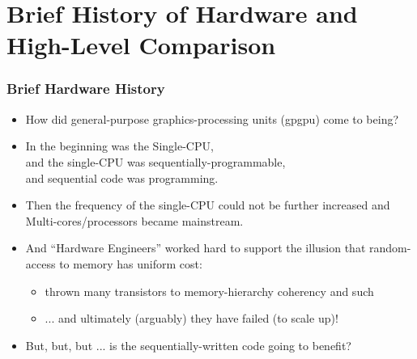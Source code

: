 \documentclass{beamer}
\renewcommand{\emph}[1]{\textcolor{structure}{#1}}
\begin{document}
\begin{frame}[fragile]
	\tableofcontents
\end{frame}

\section{Brief History of Hardware and High-Level Comparison}


\begin{frame}
  \frametitle{Brief Hardware History} 
  \centering
\begin{itemize}
    \item How did general-purpose graphics-processing units (\emph{{\sc gpgpu}}) come to being?\bigskip 
    
    \item In the beginning was the \emph{Single-CPU},\smallskip \\ 
            and the \emph{single-CPU} was sequentially-programmable,\smallskip \\ 
            and sequential code was programming.\bigskip

    \item Then the frequency of the single-CPU could not be further increased 
            and \emph{Multi-cores/processors} became mainstream. \bigskip

    \item And ``Hardware Engineers'' worked hard to support the illusion that 
            random-access to memory has uniform cost: \\ \smallskip
        \begin{itemize}
            \item   thrown many transistors to memory-hierarchy coherency and such\\ \smallskip
            \item   ... and ultimately (arguably) they have failed (to scale up)!
        \end{itemize} \bigskip
\bigskip

    \item But, but, but ... is the sequentially-written code going to benefit?
\end{itemize}
\end{frame}
\end{document}
